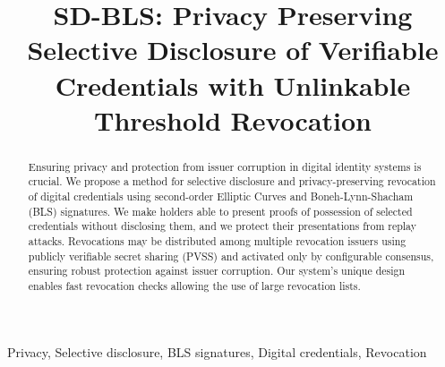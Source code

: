 \documentclass[conference]{IEEEtran}
\begin{document}
\title{SD-BLS: Privacy Preserving Selective Disclosure of Verifiable Credentials with Unlinkable Threshold Revocation\\
}

\author{
\and
{}
\and
{}
\and
{}
}

\maketitle

\begin{abstract}
 Ensuring privacy and protection from issuer corruption in digital identity systems is crucial. We propose a method for selective disclosure and privacy-preserving revocation of digital credentials using second-order Elliptic Curves and Boneh-Lynn-Shacham (BLS) signatures. We make holders able to present proofs of possession of selected credentials without disclosing them, and we protect their presentations from replay attacks. Revocations may be distributed among multiple revocation issuers using publicly verifiable secret sharing (PVSS) and activated only by configurable consensus, ensuring robust protection against issuer corruption. Our system’s unique design enables fast revocation checks allowing the use of large revocation lists.
\end{abstract}

\begin{IEEEkeywords}
Privacy, Selective disclosure, BLS signatures, Digital credentials, Revocation
\end{IEEEkeywords}
\end{document}
